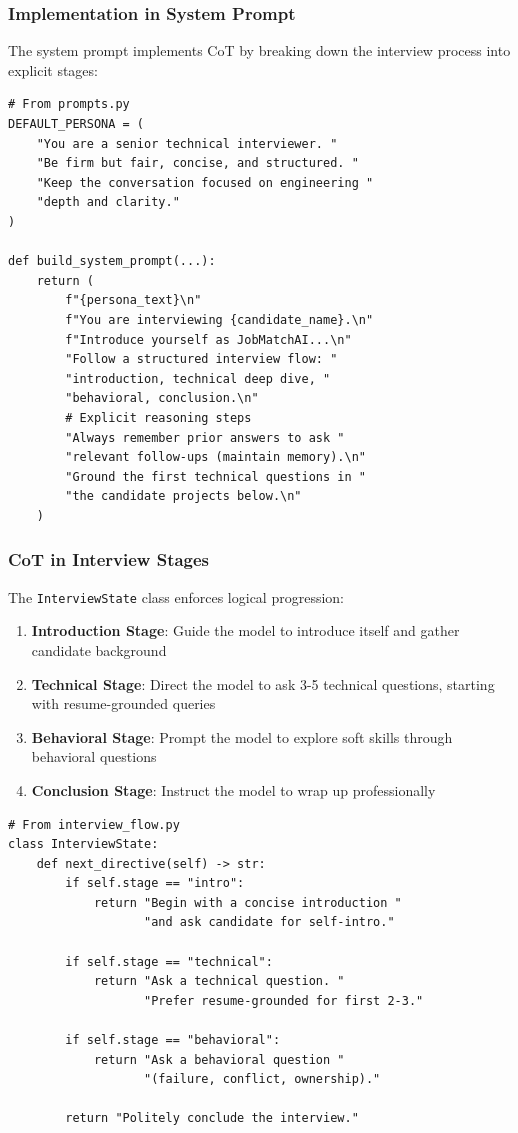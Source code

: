 \documentclass[12pt,a4paper]{article}
\begin{document}
\subsubsection{Implementation in System Prompt}
The system prompt implements CoT by breaking down the interview process into explicit stages:

\begin{lstlisting}[caption=Chain-of-Thought Implementation]
# From prompts.py
DEFAULT_PERSONA = (
    "You are a senior technical interviewer. "
    "Be firm but fair, concise, and structured. "
    "Keep the conversation focused on engineering "
    "depth and clarity."
)

def build_system_prompt(...):
    return (
        f"{persona_text}\n"
        f"You are interviewing {candidate_name}.\n"
        f"Introduce yourself as JobMatchAI...\n"
        "Follow a structured interview flow: "
        "introduction, technical deep dive, "
        "behavioral, conclusion.\n"
        # Explicit reasoning steps
        "Always remember prior answers to ask "
        "relevant follow-ups (maintain memory).\n"
        "Ground the first technical questions in "
        "the candidate projects below.\n"
    )
\end{lstlisting}

\subsubsection{CoT in Interview Stages}
The \texttt{InterviewState} class enforces logical progression:

\begin{enumerate}
    \item \textbf{Introduction Stage}: Guide the model to introduce itself and gather candidate background
    \item \textbf{Technical Stage}: Direct the model to ask 3-5 technical questions, starting with resume-grounded queries
    \item \textbf{Behavioral Stage}: Prompt the model to explore soft skills through behavioral questions
    \item \textbf{Conclusion Stage}: Instruct the model to wrap up professionally
\end{enumerate}

\begin{lstlisting}[caption=Interview State Machine]
# From interview_flow.py
class InterviewState:
    def next_directive(self) -> str:
        if self.stage == "intro":
            return "Begin with a concise introduction "
                   "and ask candidate for self-intro."
        
        if self.stage == "technical":
            return "Ask a technical question. "
                   "Prefer resume-grounded for first 2-3."
        
        if self.stage == "behavioral":
            return "Ask a behavioral question "
                   "(failure, conflict, ownership)."
        
        return "Politely conclude the interview."
\end{lstlisting}
\end{document}
